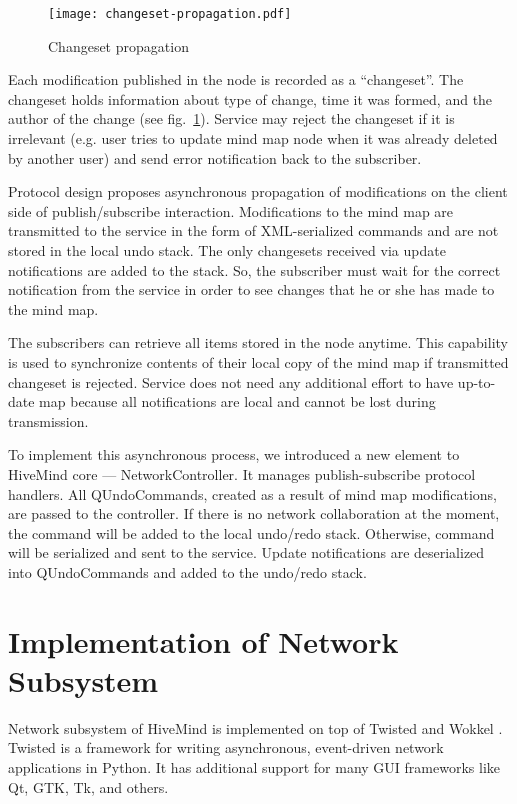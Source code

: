 
\begin{figure}
\centering
\texttt{[image: changeset-propagation.pdf]}
\caption{Changeset propagation}
\label{Changeset propagation}
\end{figure}

Each modification published in the node is recorded as a ``changeset''. The
changeset holds information about type of change, time it was formed, and the
author of the change (see fig.~\ref{Changeset propagation}). Service may reject
the changeset if it is irrelevant (e.g. user tries to update mind map node when
it was already deleted by another user) and send error notification back to the
subscriber.

Protocol design proposes asynchronous propagation of modifications on the client
side of publish/subscribe interaction. Modifications to the mind map are
transmitted to the service in the form of XML-serialized commands and are not
stored in the local undo stack. The only changesets received via update
notifications are added to the stack. So, the subscriber must wait for the
correct notification from the service in order to see changes that he or she has
made to the mind map.

The subscribers can retrieve all items stored in the node anytime. This
capability is used to synchronize contents of their local copy of the mind map
if transmitted changeset is rejected. Service does not need any additional
effort to have up-to-date map because all notifications are local and cannot be
lost during transmission.

To implement this asynchronous process, we introduced a new element to HiveMind
core --- NetworkController. It manages publish-subscribe protocol handlers. All
QUndoCommands, created as a result of mind map modifications, are passed to the
controller. If there is no network collaboration at the moment, the command will
be added to the local undo/redo stack. Otherwise, command will be serialized and
sent to the service. Update notifications are deserialized into QUndoCommands
and added to the undo/redo stack.


\section{Implementation of Network Subsystem}

Network subsystem of HiveMind is implemented on top of Twisted \cite{twisted} and
Wokkel \cite{wokkel}. Twisted is a framework for writing asynchronous,
event-driven network applications in Python. It has additional support for many
GUI frameworks like Qt, GTK, Tk, and others.


